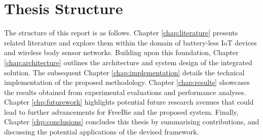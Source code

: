 \section{Thesis Structure}
The structure of this report is as follows. Chapter \ref{chap:literature} presents related literature and explore them within the domain of battery-less IoT devices and wireless body sensor networks. Building upon this foundation, Chapter \ref{chap:architecture} outlines the architecture and system design of the integrated solution. The subsequent Chapter \ref{chap:implementation} details the technical implementation of the proposed methodology. Chapter \ref{chap:results} showcases the results obtained from experimental evaluations and performance analyses.  Chapter \ref{chp:futurework} highlights potential future research avenues that could lead to further advancements for FreeBie and the proposed system. Finally, Chapter \ref{chp:conclusions} concludes this thesis by summarising contributions, and discussing the potential applications of the devised framework.